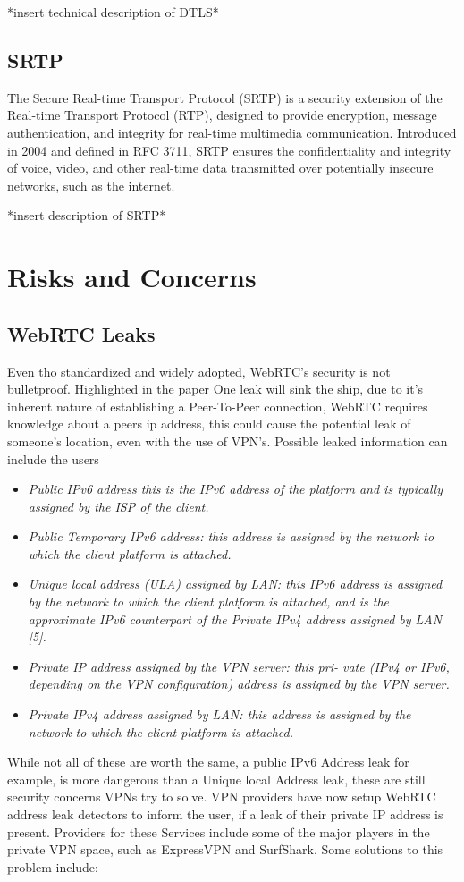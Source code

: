 \documentclass[conference]{IEEEtran}
\begin{document}
*insert technical description of DTLS*

\subsection{SRTP}
The Secure Real-time Transport Protocol (SRTP) is a security extension of the Real-time Transport Protocol (RTP), 
designed to provide encryption, message authentication, and integrity for real-time multimedia communication. 
Introduced in 2004 and defined in RFC 3711, SRTP ensures the confidentiality and integrity of voice, video, and 
other real-time data transmitted over potentially insecure networks, such as the internet. \cite{RFC3711}

*insert description of SRTP*

\section{Risks and Concerns}
\subsection{WebRTC Leaks}
Even tho standardized and widely adopted, WebRTC's security is not bulletproof. 
Highlighted in the paper One leak will sink the ship, due to it's inherent nature 
of establishing a Peer-To-Peer connection, WebRTC requires
knowledge about a peers ip address, this could cause the potential leak of someone's location, even with
the use of VPN's. Possible leaked information can include the users 
\begin{itemize}
    \item \it{Public IPv6 address} this is the IPv6 address of the
    platform and is typically assigned by the ISP of the client.
    \item \it{Public Temporary IPv6 address:} this address is assigned
    by the network to which the client platform is attached.
    \item \it{Unique local address (ULA) assigned by LAN:} this IPv6
    address is assigned by the network to which the client
    platform is attached, and is the approximate IPv6 counterpart of 
    the Private IPv4 address assigned by LAN [5].
    \item \it{Private IP address assigned by the VPN server:} this pri-
    vate (IPv4 or IPv6, depending on the VPN configuration)
    address is assigned by the VPN server.
    \item \it{Private IPv4 address assigned by LAN:} this address is 
    assigned by the network to which the client platform is
    attached.
  \end{itemize}\cite{One_leak_will_sink_a_ship}
While not all of these are worth the same, a public IPv6 Address leak for example, is more dangerous than a
Unique local Address leak, these are still security concerns VPNs try to solve.
VPN providers have now setup WebRTC address leak detectors to inform the user, if a leak of their private IP address
is present. Providers for these Services include some of the major players in the private VPN space, such as 
ExpressVPN and SurfShark. %
Some solutions to this problem include:
\end{document}
